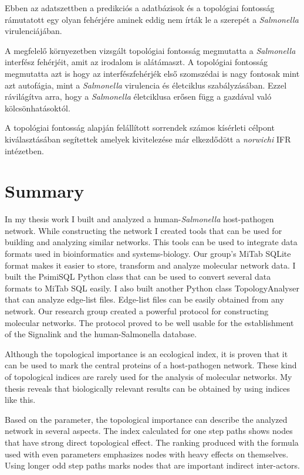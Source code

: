 \documentclass[a4paper,12pt]{article}
\begin{document}
		Ebben az adatszettben a predikciós a adatbázisok és a topológiai fontosság rámutatott egy olyan fehérjére aminek eddig nem írták le a szerepét a \textit{Salmonella} virulenciájában. 
		
		A megfelelő környezetben vizsgált topológiai fontosság megmutatta a \textit{Salmonella} interfész fehérjéit, amit az irodalom is alátámaszt. A topológiai fontosság megmutatta azt is hogy az interfészfehérjék első szomszédai is nagy fontosak mint azt autofágia, mint a \textit{Salmonella} virulencia és életciklus szabályzásában. Ezzel rávilágítva arra, hogy a \textit{Salmonella} életciklusa erősen függ a gazdával való kölcsönhatásoktól.
		
		A topológiai fontosság alapján felállított sorrendek számos kísérleti célpont kiválasztásában segítettek amelyek kivitelezése már elkezdődött a \textit{norwichi} IFR intézetben.
		
		\pagebreak
		
		

\section{Summary}
		
		In my thesis work I built and analyzed a human-\textit{Salmonella} host-pathogen network. While constructing the network I created tools that can be used for building and analyzing similar networks. This tools can be used to integrate data formats used in bioinformatics and systems-biology. Our group's MiTab SQLite format makes it easier to  store, transform and analyze molecular network data.
		I built the PsimiSQL Python class that can be used to convert several data formats to MiTab SQL easily. I also built another Python class TopologyAnalyser that can analyze edge-list files. Edge-list files can be easily obtained from any network. Our research group created a powerful protocol for constructing molecular networks. The protocol proved to be well usable for the establishment of the Signalink and the human-Salmonella database.
		
		Although the topological importance is an ecological index, it is proven that it can be used to mark the central proteins of a host-pathogen network. These kind of topological indices are rarely used for the analysis of molecular networks. My thesis reveals that biologically relevant results can be obtained by using indices like this. 
		
		Based on the parameter, the topological importance can describe the analyzed network in several aspects. The index calculated for one step paths shows nodes that have strong direct topological effect. The ranking produced with the formula used with even parameters emphasizes nodes with heavy effects on themselves. Using longer odd step paths marks nodes that are important  indirect inter-actors.
		
\end{document}
